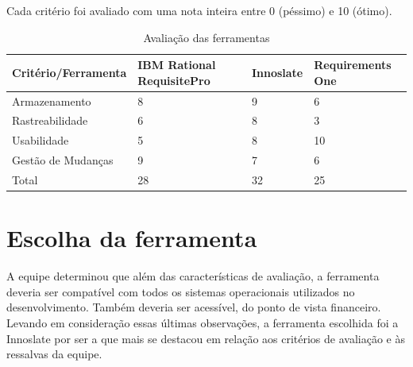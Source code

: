 Cada critério foi avaliado com uma nota inteira entre 0 (péssimo) e 10 (ótimo).

\begin{table}[]
\centering
\label{tools-performance}
\begin{tabular}{|l|l|l|l|}
\hline
Critério/Ferramenta                          & IBM Rational RequisitePro & Innoslate & Requirements One \\ \hline
Armazenamento                                & 8                         & 9         & 6                \\ \hline
Rastreabilidade                              & 6                         & 8         & 3                \\ \hline
Usabilidade                                  & 5                         & 8         & 10               \\ \hline
Gestão de Mudanças                           & 9                         & 7         & 6                \\ \hline
Total                                        & 28                        & 32        & 25               \\ \hline
\end{tabular}
\caption{Avaliação das ferramentas}
\end{table}

\section{Escolha da ferramenta}

A equipe determinou que além das características de avaliação, a ferramenta deveria ser compatível com todos os sistemas operacionais utilizados no desenvolvimento. Também deveria ser acessível, do ponto de vista financeiro. Levando em consideração essas últimas observações, a ferramenta escolhida foi a Innoslate por ser a que mais se destacou em relação aos critérios de avaliação e às ressalvas da equipe.


